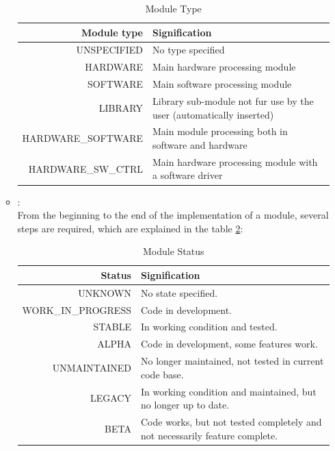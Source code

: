 \begin{enumerate}
\begin{itemize}
			\begin{table}[!ht]
				\centering
				\footnotesize
				\begin{tabular}{|r|l|}
					\hline
					 \textbf{Module type} & \textbf{Signification} \\ \hline
					 UNSPECIFIED & No type specified \\ \hline
					 HARDWARE &Main \asterics hardware processing module \\ \hline
					 SOFTWARE &Main \asterics software processing module \\ \hline
					 LIBRARY& Library sub-module not fur use by the user (automatically inserted) \\ \hline
					 HARDWARE\_SOFTWARE &Main \asterics module processing both in software and hardware \\ \hline
					 HARDWARE\_SW\_CTRL& Main \asterics hardware processing module with a software driver \\ \hline
				\end{tabular}
				\caption{Module Type}
				\label{tab:06-05-module-type}
			\end{table}
			\item {}:\\
				From the beginning to the end of the implementation of a module, several steps are required, which are explained in the table \ref{tab:06-05-module-status}: 
		\begin{table}[!ht]
			\centering
			\footnotesize
			\begin{tabular}{|r|l|}
				\hline
				\textbf{Status} & \textbf{Signification} \\ \hline
				UNKNOWN& No state specified.\\ \hline
				 WORK\_IN\_PROGRESS &Code in development.\\ \hline
				 STABLE &In working condition and tested.\\ \hline
				 ALPHA &Code in development, some features work.\\ \hline
				 UNMAINTAINED& No longer maintained, not tested in current code base.\\ \hline
				 LEGACY& In working condition and maintained, but no longer up to date.\\ \hline
				 BETA &Code works, but not tested completely and not necessarily feature complete.\\ \hline
			\end{tabular}
			\caption{Module Status}
			\label{tab:06-05-module-status}
		\end{table}

\end{itemize}
\end{enumerate}
